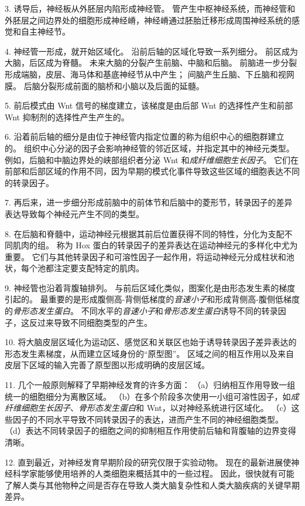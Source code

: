 3. 诱导后，神经板从外胚层内陷形成神经管。
管产生中枢神经系统，而神经管和外胚层之间边界处的细胞形成神经嵴，神经嵴通过胚胎迁移形成周围神经系统的感觉和自主神经节。


4. 神经管一形成，就开始区域化。
沿前后轴的区域化导致一系列细分。
前区成为大脑，后区成为脊髓。 未来大脑的分裂产生前脑、中脑和后脑。
前脑进一步分裂形成端脑，皮层、海马体和基底神经节从中产生；
间脑产生丘脑、下丘脑和视网膜。
后脑分裂形成前面的脑桥和小脑以及后面的延髓。


5. 前后模式由 Wnt 信号的梯度建立，该梯度是由后部 Wnt 的选择性产生和前部 Wnt 抑制剂的选择性产生产生的。


6. 沿着前后轴的细分是由位于神经管内指定位置的称为组织中心的细胞群建立的。
组织中心分泌的因子会影响神经管的邻近区域，并指定其中的神经元类型。
例如，后脑和中脑边界处的峡部组织者分泌 Wnt 和\textit{成纤维细胞生长因子}。
它们在前部和后部区域的作用不同，因为早期的模式化事件导致这些区域的细胞表达不同的转录因子。


7. 再后来，进一步细分形成前脑中的前体节和后脑中的菱形节，转录因子的差异表达导致每个神经元产生不同的类型。 


8. 在后脑和脊髓中，运动神经元根据其前后位置获得不同的特性，分化为支配不同肌肉的组。
称为 Hox 蛋白的转录因子的差异表达在运动神经元的多样化中尤为重要。
它们与其他转录因子和可溶性因子一起作用，将运动神经元分成柱状和池状，每个池都注定要支配特定的肌肉。 


9. 神经管也沿着背腹轴排列。
与前后区域化类似，图案化是由形态发生素的梯度引起的。
最重要的是形成腹侧高-背侧低梯度的\textit{音速小子}和形成背侧高-腹侧低梯度的\textit{骨形态发生蛋白}。
不同水平的\textit{音速小子}和\textit{骨形态发生蛋白}诱导不同的转录因子，这反过来导致不同细胞类型的产生。 


10. 将大脑皮层区域化为运动区、感觉区和关联区也始于诱导转录因子差异表达的形态发生素梯度，从而建立区域身份的“原型图”。
区域之间的相互作用以及来自皮层下区域的输入完善了原型图以形成明确的皮层区域。 


11. 几个一般原则解释了早期神经发育的许多方面： 
（a）归纳相互作用导致一组统一的细胞细分为离散区域。
（b）在多个阶段多次使用一小组可溶性因子，如\textit{成纤维细胞生长因子}、\textit{骨形态发生蛋白}和 Wnt，以对神经系统进行区域化。
（c）这些因子的不同水平导致不同转录因子的表达，进而产生不同的神经细胞类型。
（d）表达不同转录因子的细胞之间的抑制相互作用使前后轴和背腹轴的边界变得清晰。


12. 直到最近，对神经发育早期阶段的研究仅限于实验动物。
现在的最新进展使神经科学家能够使用培养的人类细胞来概括其中的一些过程。
因此，很快就有可能了解人类与其他物种之间是否存在导致人类大脑复杂性和人类大脑疾病的关键早期差异。

